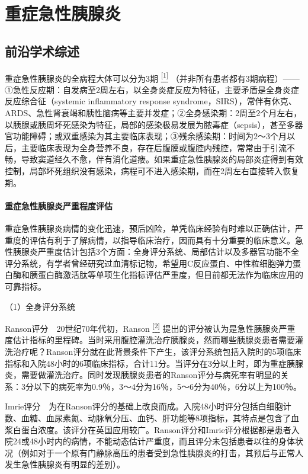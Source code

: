 \chapter{重症急性胰腺炎}

\section{前沿学术综述}

重症急性胰腺炎的全病程大体可以分为3期
\protect\hyperlink{text00021.htmlux5cux23ch1-20}{\textsuperscript{{[}1{]}}}
（并非所有患者都有3期病程）------①急性反应期：自发病至2周左右，以全身炎症反应为特征，主要矛盾是全身炎症反应综合征（systemic
inflammatory response
syndrome，SIRS），常伴有休克、ARDS、急性肾衰竭和胰性脑病等主要并发症；②全身感染期：2周至2个月左右，以胰腺或胰周坏死感染为特征，局部的感染极易发展为脓毒症（sepsis），甚至多器官功能障碍；或双重感染为其主要临床表现；③残余感染期：时间为2～3个月以后，主要临床表现为全身营养不良，存在后腹膜或腹腔内残腔，常常由于引流不畅，导致窦道经久不愈，伴有消化道瘘。如果重症急性胰腺炎的局部炎症得到有效控制，局部坏死组织没有感染，病程可不进入感染期，而在2周左右直接转入恢复期。

\subsubsection{重症急性胰腺炎严重程度评估}

重症急性胰腺炎病情的变化迅速，预后凶险，单凭临床经验有时难以正确估计，严重度的评估有利于了解病情，以指导临床治疗，因而具有十分重要的临床意义。急性胰腺炎严重度估计包括3个方面：全身评分系统、局部估计以及多器官功能不全评分系统，有学者曾经研究过血清标记物，希望用C反应蛋白、中性粒细胞弹力蛋白酶和胰蛋白酶激活肽等单项生化指标评估严重度，但目前都无法作为临床应用的可靠指标。

（1）全身评分系统

Ranson评分　20世纪70年代初，Ranson
\protect\hyperlink{text00021.htmlux5cux23ch2-20}{\textsuperscript{{[}2{]}}}
提出的评分被认为是急性胰腺炎严重度估计指标的里程碑。当时采用腹腔灌洗治疗胰腺炎，然而哪些胰腺炎患者需要灌洗治疗呢？Ranson评分就在此背景条件下产生，该评分系统包括入院时的5项临床指标和入院48小时的6项临床指标，合计11分。当评分在3分以上时，即为重症胰腺炎，需要做灌洗治疗。同时发现胰腺炎患者的Ranson评分与病死率有明显的关系：3分以下的病死率为0.9％，3～4分为16％，5～6分为40％，6分以上为100％。

Imrie评分　为在Ranson评分的基础上改良而成。入院48小时评分包括白细胞计数、血糖、血尿素氮、动脉氧分压、血钙、肝功能等8项指标，其特点是包含了血浆白蛋白浓度。该评分在英国应用较广。Ranson评分和Imrie评分根据都是患者入院24或48小时内的病情，不能动态估计严重度，而且评分未包括患者以往的身体状况（例如对于一个原有门静脉高压的患者受到急性胰腺炎的打击，其预后与正常人发生急性胰腺炎有明显的差别）。

